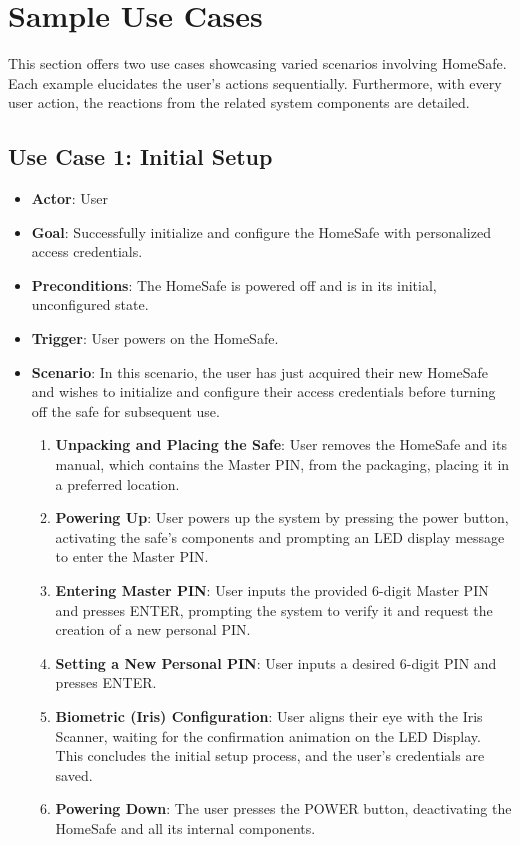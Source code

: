 \documentclass{article}
\begin{document}
\section{Sample Use Cases}
This section offers two use cases showcasing varied scenarios involving HomeSafe. Each example elucidates the user's actions sequentially. Furthermore, with every user action, the reactions from the related system components are detailed.

\subsection{Use Case 1: Initial Setup}
\begin{itemize}
    \item \textbf{Actor}: User
    \item \textbf{Goal}: Successfully initialize and configure the HomeSafe with personalized access credentials.
    \item \textbf{Preconditions}: The HomeSafe is powered off and is in its initial, unconfigured state.
    \item \textbf{Trigger}: User powers on the HomeSafe.
    \item \textbf{Scenario}: In this scenario, the user has just acquired their new HomeSafe and wishes to initialize and configure their access credentials before turning off the safe for subsequent use.
    \begin{enumerate}
    \item \textbf{Unpacking and Placing the Safe}: User removes the HomeSafe and its manual, which contains the Master PIN, from the packaging, placing it in a preferred location.
    \item \textbf{Powering Up}: User powers up the system by pressing the power button, activating the safe's components and prompting an LED display message to enter the Master PIN.
    \item \textbf{Entering Master PIN}: User inputs the provided 6-digit Master PIN and presses ENTER, prompting the system to verify it and request the creation of a new personal PIN.
    \item \textbf{Setting a New Personal PIN}: User inputs a desired 6-digit PIN and presses ENTER.
    \item \textbf{Biometric (Iris) Configuration}: User aligns their eye with the Iris Scanner, waiting for the confirmation animation on the LED Display. This concludes the initial setup process, and the user's credentials are saved.
    \item \textbf{Powering Down}: The user presses the POWER button, deactivating the HomeSafe and all its internal components.
    \end{enumerate}
\end{itemize}
\end{document}
